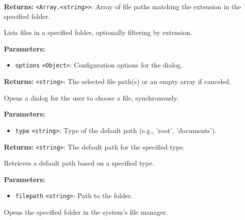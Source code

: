 \documentclass[12pt,a4paper]{article}
\begin{document}
\noindent \textbf{Returns:} \texttt{<Array.<string>>}: Array of file paths matching the extension in the specified folder.

\noindent Lists files in a specified folder, optionally filtering by extension.

\vspace{5mm}
\noindent {}


\noindent \textbf{Parameters:}
\begin{itemize}
  \item \texttt{options} \texttt{<Object>}: Configuration options for the dialog.
\end{itemize}

\noindent \textbf{Returns:} \texttt{<string>}: The selected file path(s) or an empty array if canceled.

\noindent Opens a dialog for the user to choose a file, synchronously.

\vspace{5mm}
\noindent {}


\noindent \textbf{Parameters:}
\begin{itemize}
  \item \texttt{type} \texttt{<string>}: Type of the default path (e.g., 'root', 'documents').
\end{itemize}

\noindent \textbf{Returns:} \texttt{<string>}: The default path for the specified type.

\noindent Retrieves a default path based on a specified type.

\vspace{5mm}
\noindent {}


\noindent \textbf{Parameters:}
\begin{itemize}
  \item \texttt{filepath} \texttt{<string>}: Path to the folder.
\end{itemize}

\noindent Opens the specified folder in the system's file manager.

\vspace{5mm}
\noindent {}
\end{document}
